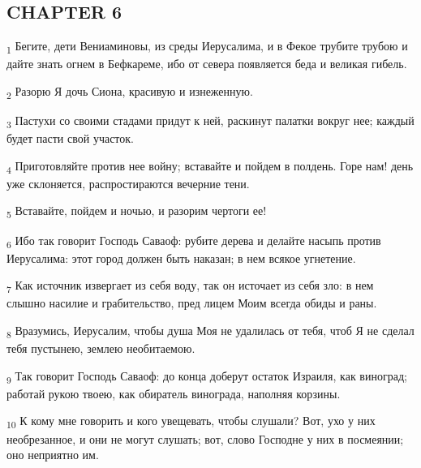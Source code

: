 \subsection{CHAPTER 6}
\begin{tcolorbox}
\textsubscript{1} Бегите, дети Вениаминовы, из среды Иерусалима, и в Фекое трубите трубою и дайте знать огнем в Бефкареме, ибо от севера появляется беда и великая гибель.
\end{tcolorbox}
\begin{tcolorbox}
\textsubscript{2} Разорю Я дочь Сиона, красивую и изнеженную.
\end{tcolorbox}
\begin{tcolorbox}
\textsubscript{3} Пастухи со своими стадами придут к ней, раскинут палатки вокруг нее; каждый будет пасти свой участок.
\end{tcolorbox}
\begin{tcolorbox}
\textsubscript{4} Приготовляйте против нее войну; вставайте и пойдем в полдень. Горе нам! день уже склоняется, распростираются вечерние тени.
\end{tcolorbox}
\begin{tcolorbox}
\textsubscript{5} Вставайте, пойдем и ночью, и разорим чертоги ее!
\end{tcolorbox}
\begin{tcolorbox}
\textsubscript{6} Ибо так говорит Господь Саваоф: рубите дерева и делайте насыпь против Иерусалима: этот город должен быть наказан; в нем всякое угнетение.
\end{tcolorbox}
\begin{tcolorbox}
\textsubscript{7} Как источник извергает из себя воду, так он источает из себя зло: в нем слышно насилие и грабительство, пред лицем Моим всегда обиды и раны.
\end{tcolorbox}
\begin{tcolorbox}
\textsubscript{8} Вразумись, Иерусалим, чтобы душа Моя не удалилась от тебя, чтоб Я не сделал тебя пустынею, землею необитаемою.
\end{tcolorbox}
\begin{tcolorbox}
\textsubscript{9} Так говорит Господь Саваоф: до конца доберут остаток Израиля, как виноград; работай рукою твоею, как обиратель винограда, наполняя корзины.
\end{tcolorbox}
\begin{tcolorbox}
\textsubscript{10} К кому мне говорить и кого увещевать, чтобы слушали? Вот, ухо у них необрезанное, и они не могут слушать; вот, слово Господне у них в посмеянии; оно неприятно им.
\end{tcolorbox}
